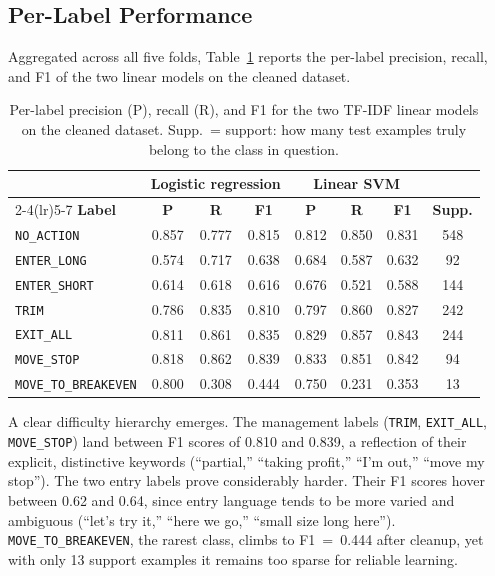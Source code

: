 \subsection{Per-Label Performance}
\label{sec:results_per_label}

Aggregated across all five folds, Table~\ref{tab:per_label_linear} reports the per-label precision, recall, and F1 of the two linear models on the cleaned dataset.

\begin{table}[H]
\centering
\caption{Per-label precision (P), recall (R), and F1 for the two TF-IDF linear models on the cleaned dataset. Supp.\ = support: how many test examples truly belong to the class in question.}
\label{tab:per_label_linear}
\small
\setlength{\tabcolsep}{4pt}
\begin{tabular}{@{}l ccc ccc c@{}}
\toprule
& \multicolumn{3}{c}{\textbf{Logistic regression}} & \multicolumn{3}{c}{\textbf{Linear SVM}} & \\
\cmidrule(lr){2-4}\cmidrule(lr){5-7}
\textbf{Label} & \textbf{P} & \textbf{R} & \textbf{F1} & \textbf{P} & \textbf{R} & \textbf{F1} & \textbf{Supp.} \\
\midrule
\texttt{NO\_ACTION}          & 0.857 & 0.777 & 0.815 & 0.812 & 0.850 & 0.831 & 548 \\
\texttt{ENTER\_LONG}         & 0.574 & 0.717 & 0.638 & 0.684 & 0.587 & 0.632 &  92 \\
\texttt{ENTER\_SHORT}        & 0.614 & 0.618 & 0.616 & 0.676 & 0.521 & 0.588 & 144 \\
\texttt{TRIM}                & 0.786 & 0.835 & 0.810 & 0.797 & 0.860 & 0.827 & 242 \\
\texttt{EXIT\_ALL}           & 0.811 & 0.861 & 0.835 & 0.829 & 0.857 & 0.843 & 244 \\
\texttt{MOVE\_STOP}          & 0.818 & 0.862 & 0.839 & 0.833 & 0.851 & 0.842 &  94 \\
\texttt{MOVE\_TO\_BREAKEVEN} & 0.800 & 0.308 & 0.444 & 0.750 & 0.231 & 0.353 &  13 \\
\bottomrule
\end{tabular}
\end{table}

A clear difficulty hierarchy emerges. The management labels (\texttt{TRIM}, \texttt{EXIT\_ALL}, \texttt{MOVE\_STOP}) land between F1 scores of 0.810 and 0.839, a reflection of their explicit, distinctive keywords (``partial,'' ``taking profit,'' ``I'm out,'' ``move my stop''). The two entry labels prove considerably harder. Their F1 scores hover between 0.62 and 0.64, since entry language tends to be more varied and ambiguous (``let's try it,'' ``here we go,'' ``small size long here''). \texttt{MOVE\_TO\_BREAKEVEN}, the rarest class, climbs to F1~=~0.444 after cleanup, yet with only 13 support examples it remains too sparse for reliable learning.

